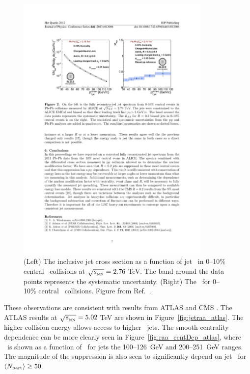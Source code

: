 \begin{figure}[htbp]
\begin{center}
\includegraphics[width=0.85\textwidth]{figures/jetMeasurements/jet_raa_alice}
\caption{(Left) The inclusive jet cross section as a function of jet \pt\ in 0--10\% central \pbpb\ collisions at $\mbox{$\sqrt{s_{_\text{NN}}}$} = 2.76$ TeV.
The band around the data points represents the systematic uncertainty.
(Right) The \RAA\ for 0--10\% central \pbpb\ collisions.
Figure from Ref.~\cite{Reed_2013}.}
\label{fig:jet_raa_alice}
\end{center}
\end{figure}


These observations are consistent with results from ATLAS and CMS \cite{Aad:2014bxa, 2019108, Khachatryan:2016jfl, Verweij:2012ch}.
The ATLAS results at $\mbox{$\sqrt{s_{_\text{NN}}}$} = 5.02$ TeV are shown in Figure~\ref{fig:jetraa_atlas}.
The higher collision energy allows access to higher \pt\ jets.
The smooth centrality dependence can be more clearly seen in Figure~\ref{fig:raa_centDep_atlas}, where \RAA\ is shown as a function of \ANpart\ for jets the \mbox{100--126 GeV} and \mbox{200--251 GeV} ranges.
The magnitude of the suppression is also seen to significantly depend on jet \pt\ for $\mbox{$\langle N_{\mathrm{part}}\rangle$} \geq 50$.


